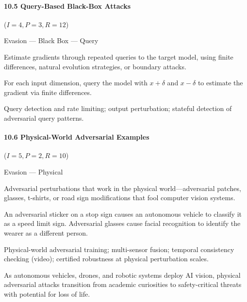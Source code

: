 \documentclass[conference]{IEEEtran}
\newenvironment{attackentry}{\begin{description}[style=unboxed,leftmargin=0cm,itemsep=1pt,parsep=1pt,topsep=2pt,font=\sffamily\small\color{accentdark}]}{\end{description}}
\begin{document}
\paragraph{10.5 Query-Based Black-Box Attacks} ($I{=}4, P{=}3, R{=}12$)
\begin{attackentry}
\item[Category:] Evasion --- Black Box --- Query
\item[How it works:] Estimate gradients through repeated queries to the target model, using finite differences, natural evolution strategies, or boundary attacks.
\item[Example:] For each input dimension, query the model with $x + \delta$ and $x - \delta$ to estimate the gradient via finite differences.
\item[Mitigations:] Query detection and rate limiting; output perturbation; stateful detection of adversarial query patterns.
\end{attackentry}

\paragraph{10.6 Physical-World Adversarial Examples} ($I{=}5, P{=}2, R{=}10$)
\begin{attackentry}
\item[Category:] Evasion --- Physical
\item[How it works:] Adversarial perturbations that work in the physical world---adversarial patches, glasses, t-shirts, or road sign modifications that fool computer vision systems.
\item[Example:] An adversarial sticker on a stop sign causes an autonomous vehicle to classify it as a speed limit sign. Adversarial glasses cause facial recognition to identify the wearer as a different person.
\item[Mitigations:] Physical-world adversarial training; multi-sensor fusion; temporal consistency checking (video); certified robustness at physical perturbation scales.
\item[Novel Inference (Hypothesized):] As autonomous vehicles, drones, and robotic systems deploy AI vision, physical adversarial attacks transition from academic curiosities to safety-critical threats with potential for loss of life.
\end{attackentry}
\end{document}
